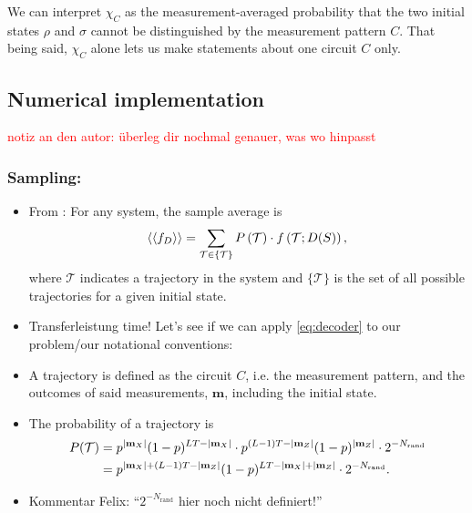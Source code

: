 We can interpret $\chi_C$ as the measurement-averaged probability that the two
initial states $\rho$ and $\sigma$ cannot be distinguished by the measurement
pattern $C$. That being said, $\chi_C$ alone lets us make statements about one circuit
$C$ only.




\subsection{Numerical implementation}
\textcolor{red}{notiz an den autor: \"uberleg dir nochmal genauer, was wo hinpasst}

\subsubsection{Sampling:}
\begin{itemize}
  \item From \cite{roserDecodingProjectiveTransverse2023}:
    For any system, the sample average is
    \begin{align}\label{eq:decoder}
      \expval{\expval{f_D}} = \sum_{\mathcal{T} \in \{
    \mathcal{T} \} } P\left(\mathcal{T}\right) \cdot
    f\left(\mathcal{T} ; D(S)\right)
    ,\end{align}
  where $\mathcal{T}$ indicates a trajectory in the system and
  $\{ \mathcal{T} \}$ is the set of all possible trajectories for a given
  initial state.
  \item Transferleistung time! Let's see if we can apply \cref{eq:decoder} to our
    problem/our notational conventions:
  \item A trajectory is defined as the circuit $C$, i.e. the measurement pattern,
    and the outcomes of said measurements, $\mathbf{m}$, including the initial
    state. 
  \item The probability of a trajectory is
    \begin{align}
      P(\mathcal{T}) &=
      p^{\abs{\mathbf{m}_X}}(1-p)^{LT-\abs{\mathbf{m}_X}}\cdot
      p^{(L-1)T-\abs{\mathbf{m}_Z}}(1-p)^{\abs{\mathbf{m}_Z}}\cdot
      2^{-N_\mathrm{rand}} \nonumber\\ &= 
      p^{\abs{\mathbf{m}_X}+(L-1)T-\abs{\mathbf{m}_Z}}(1-p)^{LT-\abs{\mathbf{m}_X}+\abs{\mathbf{m}_Z}}\cdot2^{-N_\mathrm{rand}}
    .\end{align}
  \item \textcolor{kw-olive}{Kommentar Felix: \enquote{$2^{-N_\mathrm{rand}}$ hier noch
    nicht definiert!}}
  

\end{itemize}
